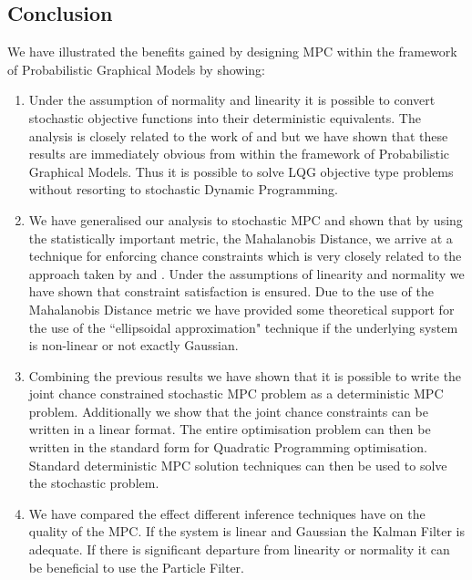 \subsection{Conclusion}
We have illustrated the benefits gained by designing MPC within the framework of Probabilistic Graphical Models by showing:
\begin{enumerate}
\item
Under the assumption of normality and linearity it is possible to convert stochastic objective functions into their deterministic equivalents. The analysis is closely related to the work of \cite{yan1} and \cite{yan2} but we have shown that these results are immediately obvious from within the framework of Probabilistic Graphical Models. Thus it is possible to solve LQG objective type problems without resorting to stochastic Dynamic Programming.
\item
We have generalised our analysis to stochastic MPC and shown that by using the statistically important metric, the Mahalanobis Distance, we arrive at a technique for enforcing chance constraints which is very closely related to the approach taken by \cite{vanhessem2} and \cite{vanhessem1}. Under the assumptions of linearity and normality we have shown that constraint satisfaction is ensured. Due to the use of the Mahalanobis Distance metric we have provided some theoretical support for the use of the ``ellipsoidal approximation" technique if the underlying system is non-linear or not exactly Gaussian.
\item
Combining the previous results we have shown that it is possible to write the joint chance constrained stochastic MPC problem as a deterministic MPC problem. Additionally we show that the joint chance constraints can be written in a linear format. The entire optimisation problem can then be written in the standard form for Quadratic Programming optimisation. Standard deterministic MPC solution techniques can then be used to solve the stochastic problem.
\item
We have compared the effect different inference techniques have on the quality of the MPC. If the system is linear and Gaussian the Kalman Filter is adequate. If there is significant departure from linearity or normality it can be beneficial to use the Particle Filter.
\end{enumerate}